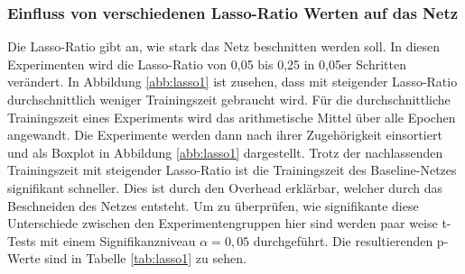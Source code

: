 \subsubsection{Einfluss von verschiedenen Lasso-Ratio Werten auf das Netz}
Die Lasso-Ratio gibt an, wie stark das Netz beschnitten werden soll. In diesen Experimenten wird die Lasso-Ratio von 0,05 bis 0,25 in 0,05er Schritten verändert. In Abbildung \ref{abb:lasso1} ist zusehen, dass mit steigender Lasso-Ratio durchschnittlich weniger Trainingszeit gebraucht wird. Für die durchschnittliche Trainingszeit eines Experiments wird das arithmetische Mittel über alle Epochen angewandt. Die Experimente werden dann nach ihrer Zugehörigkeit einsortiert und als Boxplot in Abbildung \ref{abb:lasso1} dargestellt. Trotz der nachlassenden Trainingszeit mit steigender Lasso-Ratio ist die Trainingszeit des Baseline-Netzes signifikant schneller. Dies ist durch den Overhead erklärbar, welcher durch das Beschneiden des Netzes entsteht.
Um zu überprüfen, wie signifikante diese Unterschiede zwischen den Experimentengruppen hier sind werden paar weise t-Tests mit einem Signifikanzniveau $\alpha=0,05$ durchgeführt. Die resultierenden p-Werte sind in Tabelle \ref{tab:lasso1} zu sehen.

